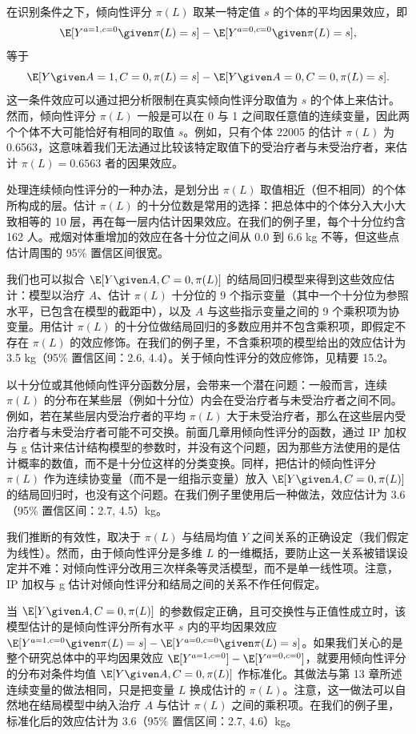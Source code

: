 在识别条件之下，倾向性评分 $\pi(L)$ 取某一特定值 $s$ 的个体的平均因果效应，即
\[
\E[Y^{a=1,c=0}\given\pi(L)=s]-\E[Y^{a=0,c=0}\given\pi(L)=s],
\]
等于
\[
\E[Y\given A=1,C=0,\pi(L)=s]-\E[Y\given A=0,C=0,\pi(L)=s].
\]
这一条件效应可以通过把分析限制在真实倾向性评分取值为 $s$ 的个体上来估计。然而，倾向性评分 $\pi(L)$ 一般是可以在 0 与 1 之间取任意值的连续变量，因此两个个体不大可能恰好有相同的取值 $s$。例如，只有个体 22005 的估计 $\pi(L)$ 为 0.6563，这意味着我们无法通过比较该特定取值下的受治疗者与未受治疗者，来估计 $\pi(L)=0.6563$ 者的因果效应。

处理连续倾向性评分的一种办法，是划分出 $\pi(L)$ 取值相近（但不相同）的个体所构成的层。估计 $\pi(L)$ 的十分位数是常用的选择：把总体中的个体分入大小大致相等的 10 层，再在每一层内估计因果效应。在我们的例子里，每个十分位约含 162 人。戒烟对体重增加的效应在各十分位之间从 0.0 到 6.6 kg 不等，但这些点估计周围的 95\% 置信区间很宽。

我们也可以拟合 $\E[Y\given A,C=0,\pi(L)]$ 的结局回归模型来得到这些效应估计：模型以治疗 $A$、估计 $\pi(L)$ 十分位的 9 个指示变量（其中一个十分位为参照水平，已包含在模型的截距中），以及 $A$ 与这些指示变量之间的 9 个乘积项为协变量。用估计 $\pi(L)$ 的十分位做结局回归的多数应用并不包含乘积项，即假定不存在 $\pi(L)$ 的效应修饰。在我们的例子里，不含乘积项的模型给出的效应估计为 3.5 kg（95\% 置信区间：2.6, 4.4）。关于倾向性评分的效应修饰，见精要 15.2。

以十分位或其他倾向性评分函数分层，会带来一个潜在问题：一般而言，连续 $\pi(L)$ 的分布在某些层（例如十分位）内会在受治疗者与未受治疗者之间不同。例如，若在某些层内受治疗者的平均 $\pi(L)$ 大于未受治疗者，那么在这些层内受治疗者与未受治疗者可能不可交换。前面几章用倾向性评分的函数，通过 IP 加权与 g 估计来估计结构模型的参数时，并没有这个问题，因为那些方法使用的是估计概率的数值，而不是十分位这样的分类变换。同样，把估计的倾向性评分 $\pi(L)$ 作为连续协变量（而不是一组指示变量）放入 $\E[Y\given A,C=0,\pi(L)]$ 的结局回归时，也没有这个问题。在我们例子里使用后一种做法，效应估计为 3.6（95\% 置信区间：2.7, 4.5）kg。

我们推断的有效性，取决于 $\pi(L)$ 与结局均值 $Y$ 之间关系的正确设定（我们假定为线性）。然而，由于倾向性评分是多维 $L$ 的一维概括，要防止这一关系被错误设定并不难：对倾向性评分改用三次样条等灵活模型，而不是单一线性项。注意，IP 加权与 g 估计对倾向性评分和结局之间的关系不作任何假定。

当 $\E[Y\given A,C=0,\pi(L)]$ 的参数假定正确，且可交换性与正值性成立时，该模型估计的是倾向性评分所有水平 $s$ 内的平均因果效应 $\E[Y^{a=1,c=0}\given\pi(L)=s]-\E[Y^{a=0,c=0}\given\pi(L)=s]$。如果我们关心的是整个研究总体中的平均因果效应 $\E[Y^{a=1,c=0}]-\E[Y^{a=0,c=0}]$，就要用倾向性评分的分布对条件均值 $\E[Y\given A,C=0,\pi(L)]$ 作标准化。其做法与第 13 章所述连续变量的做法相同，只是把变量 $L$ 换成估计的 $\pi(L)$。注意，这一做法可以自然地在结局模型中纳入治疗 $A$ 与估计 $\pi(L)$ 之间的乘积项。在我们的例子里，标准化后的效应估计为 3.6（95\% 置信区间：2.7, 4.6）kg。

